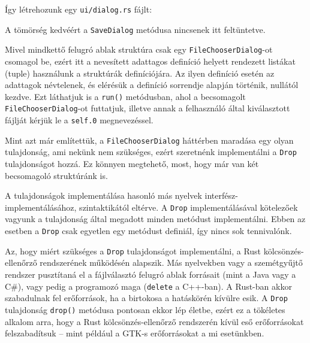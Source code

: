 Így létrehozunk egy \texttt{ui/dialog.rs} fájlt:



A tömörség kedvéért a \texttt{SaveDialog} metódusa nincsenek itt feltüntetve.

Mivel mindkettő felugró ablak struktúra csak egy \texttt{FileChooserDialog}-ot csomagol be,
ezért itt a nevesített adattagos definíció helyett rendezett listákat (tuple) használunk
a struktúrák definíciójára.
Az ilyen definíció esetén az adattagok névtelenek, és elérésük a definíció sorrendje alapján történik,
nullától kezdve.
Ezt láthatjuk is a \texttt{run()} metódusban, ahol a becsomagolt \texttt{FileChooserDialog}-ot futtatjuk,
illetve annak a felhasználó által kiválasztott fájlját kérjük le a \texttt{self.0} megnevezéssel.

Mint azt már említettük, a \texttt{FileChooserDialog} háttérben maradása egy olyan tulajdonság,
ami nekünk nem szükséges, ezért szeretnénk implementálni a \texttt{Drop} tulajdonságot hozzá.
Ez könnyen megtehető, most, hogy már van két becsomagoló struktúránk is.



A tulajdonságok implementálása hasonló más nyelvek interfész-implementálásához, szintaktikától eltérve.
A \texttt{Drop} implementálásával kötelezőek vagyunk a tulajdonság által megadott minden metódust implementálni.
Ebben az esetben a \texttt{Drop} csak egyetlen egy metódust definiál, így nincs sok tennivalónk.

Az, hogy miért szükséges a \texttt{Drop} tulajdonságot implementálni, a Rust kölcsönzés-ellenőrző
rendszerének működésén alapszik.
Más nyelvekben vagy a szemétgyűjtő rendszer pusztítaná el a fájlválasztó felugró ablak forrásait
(mint a Java vagy a C\#), vagy pedig a programozó maga (\texttt{delete} a C++-ban).
A Rust-ban akkor szabadulnak fel erőforrások, ha a birtokosa a hatáskörén kívülre esik.
A \texttt{Drop} tulajdonság \texttt{drop()} metódusa pontosan ekkor lép életbe,
ezért ez a tökéletes alkalom arra, hogy a Rust kölcsönzés-ellenőrző rendszerén kívül eső
erőforrásokat felszabadítsuk -- mint például a GTK-s erőforrásokat a mi esetünkben.



